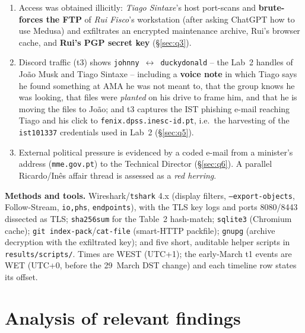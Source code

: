 \documentclass[11pt,a4paper,final,oneside]{article}
\begin{document}
\begin{enumerate}
  (SpinumMorta, GrupoLenha, MotaIngil) (§\ref{sec:q4}).
  \item Access was obtained illicitly: \emph{Tiago Sintaxe}'s host port-scans and
  \textbf{brute-forces the FTP} of \emph{Rui Fisco}'s workstation (after asking
  ChatGPT how to use Medusa) and exfiltrates an encrypted maintenance archive,
  Rui's browser cache, and \textbf{Rui's PGP secret key} (§\ref{sec:q3}).
  \item Discord traffic (t3) shows \texttt{johnny}~$\leftrightarrow$~\texttt{duckydonald}
  -- the Lab~2 handles of João Musk and Tiago Sintaxe -- including a \textbf{voice
  note} in which Tiago says he found something at AMA he was not meant to, that
  the group knows he was looking, that files were \emph{planted} on his drive to
  frame him, and that he is moving the files to João; and t3 captures the IST
  phishing e-mail reaching Tiago and his click to \texttt{fenix.dpss.inesc-id.pt},
  i.e.\ the harvesting of the \texttt{ist101337} credentials used in Lab~2
  (§\ref{sec:q5}).
  \item External political pressure is evidenced by a coded e-mail from a
  minister's address (\texttt{mme.gov.pt}) to the Technical Director
  (§\ref{sec:q6}). A parallel Ricardo/Inês affair thread is assessed as a
  \emph{red herring}.
\end{enumerate}

\textbf{Methods and tools.} Wireshark/\texttt{tshark} 4.x (display filters,
\texttt{--export-objects}, Follow-Stream, \texttt{io,phs}, \texttt{endpoints}),
with the TLS key logs and ports 8080/8443 dissected as TLS; \texttt{sha256sum}
for the Table~2 hash-match; \texttt{sqlite3} (Chromium cache); \texttt{git
index-pack}/\texttt{cat-file} (smart-HTTP packfile); \texttt{gnupg} (archive
decryption with the exfiltrated key); and five short, auditable helper scripts
in \texttt{results/scripts/}. Times are WEST (UTC+1); the early-March t1 events
are WET (UTC+0, before the 29~March DST change) and each timeline row states its
offset.

\section{Analysis of relevant findings}
\label{sec:analysis-of-relevant-findings}

\end{document}
